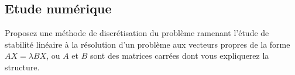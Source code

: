 \documentclass[a4paper,11pt]{article}
\begin{document}
\subsection{Etude numérique}




Proposez une méthode de discrétisation du problème ramenant l'étude de stabilité linéaire à la résolution d'un problème aux vecteurs propres de la forme $A X = \lambda B X$, ou $A$ et $B$  sont des matrices carrées dont vous expliquerez la structure.



\end{document}

